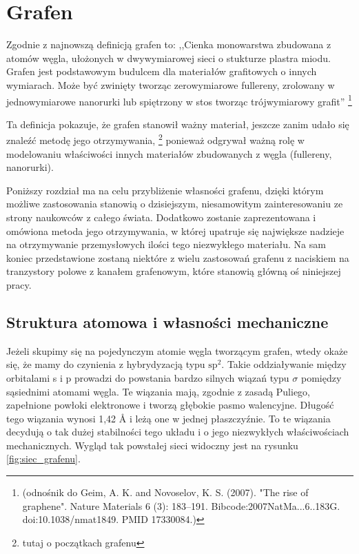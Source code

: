\chapter{Grafen}
	Zgodnie z najnowszą definicją grafen to: ,,Cienka monowarstwa zbudowana z atomów węgla,
ułożonych w dwywymiarowej sieci o stukturze plastra miodu. Grafen jest podstawowym budulcem
dla materiałów grafitowych o innych wymiarach. Może być zwinięty tworząc zerowymiarowe fullereny,
zrolowany w jednowymiarowe nanorurki lub spiętrzony w stos tworząc trójwymiarowy grafit''	
\footnote[1]{(odnośnik do Geim, A. K. and Novoselov, K. S. (2007). "The rise of graphene". Nature Materials 6 (3): 183–191. 					Bibcode:2007NatMa...6..183G. doi:10.1038/nmat1849. PMID 17330084.)}

	Ta definicja pokazuje, że grafen stanowił ważny materiał, jeszcze zanim udało się znaleźć metodę jego otrzymywania, \footnote[2]{tutaj o początkach grafenu} ponieważ odgrywał ważną rolę w modelowaniu właściwości innych materiałów zbudowanych z węgla (fullereny, nanorurki).
	
Poniższy rozdział ma na celu przybliżenie własności grafenu, dzięki którym możliwe
zastosowania stanowią o dzisiejszym, niesamowitym zainteresowaniu ze strony naukowców z całego świata. Dodatkowo
zostanie zaprezentowana i omówiona metoda jego otrzymywania, w której upatruje się 
największe nadzieje na otrzymywanie przemysłowych ilości tego niezwykłego materiału.
Na sam koniec przedstawione zostaną niektóre z wielu zastosowań grafenu z naciskiem na
tranzystory polowe z kanałem grafenowym, które stanowią główną oś niniejszej pracy.

\newpage

	\section{Struktura atomowa i własności mechaniczne}
	Jeżeli skupimy się na pojedynczym atomie węgla tworzącym grafen, wtedy okaże się, że 
	mamy do czynienia z hybrydyzacją typu $\mathrm{sp^2}$. Takie oddziaływanie między
	orbitalami s i p prowadzi do powstania bardzo silnych wiązań typu $\sigma$ pomiędzy
	sąsiednimi atomami węgla. Te wiązania mają, zgodnie z zasadą Puliego, zapełnione 
	powłoki elektronowe i tworzą głębokie pasmo walencyjne. Długość tego wiązania wynosi
	1,42 Å i leżą one w jednej płaszczyźnie. To te wiązania decydują o tak dużej stabilności tego
	układu i o jego niezwykłych właściwościach mechanicznych. Wygląd tak powstałej sieci widoczny jest na 
	rysunku \ref{fig:siec_grafenu}. 
	
